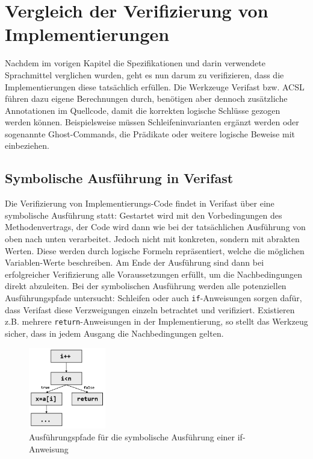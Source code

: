 ﻿\chapter{Vergleich der Verifizierung von Implementierungen}

Nachdem im vorigen Kapitel die Spezifikationen und darin verwendete Sprachmittel verglichen wurden,
geht es nun darum zu verifizieren, dass die Implementierungen diese tatsächlich erfüllen.
Die Werkzeuge Verifast bzw. ACSL führen dazu eigene Berechnungen durch, benötigen aber dennoch
zusätzliche Annotationen im Quellcode, damit die korrekten logische Schlüsse gezogen 
werden können. Beispielsweise müssen Schleifeninvarianten ergänzt werden oder sogenannte
Ghost-Commands, die Prädikate oder weitere logische Beweise mit einbeziehen.

\section{Symbolische Ausführung in Verifast}

Die Verifizierung von Implementierungs-Code findet in Verifast über eine symbolische Ausführung statt:
Gestartet wird mit den Vorbedingungen des Methodenvertrags, der Code wird dann wie bei der tatsächlichen
Ausführung von oben nach unten verarbeitet. Jedoch nicht mit konkreten, sondern mit 
abrakten Werten. Diese werden durch logische Formeln repräsentiert, welche die möglichen Variablen-Werte 
beschreiben. Am Ende der Ausführung sind dann bei erfolgreicher Verifizierung alle Voraussetzungen
erfüllt, um die Nachbedingungen direkt abzuleiten.
\newline
\newline
Bei der symbolischen Ausführung werden alle potenziellen Ausführungspfade untersucht: Schleifen
oder auch \texttt{if}-Anweisungen sorgen dafür, dass Verifast diese Verzweigungen einzeln betrachtet
und verifiziert. Existieren z.B. mehrere \texttt{return}-Anweisungen in der Implementierung, so stellt
das Werkzeug sicher, dass in jedem Ausgang die Nachbedingungen gelten.

\begin{figure}
	\centering
		\includegraphics[width=0.3\textwidth]{images/symbolic_execution.png}
		\caption{Ausführungspfade für die symbolische Ausführung einer if-Anweisung}
\end{figure}


